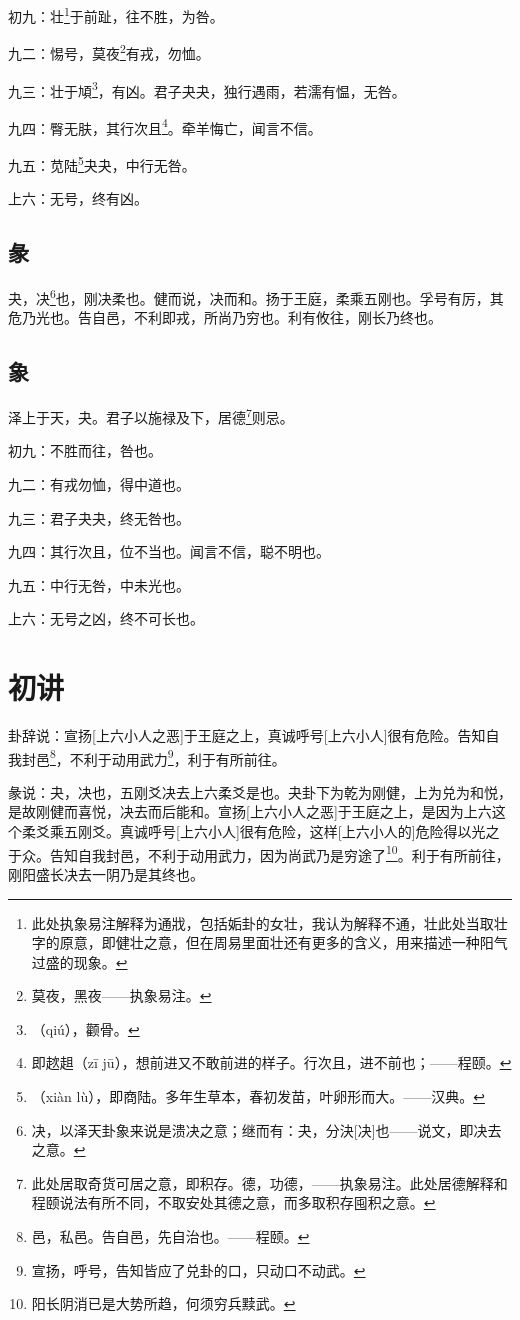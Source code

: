 \documentclass[12pt,oneside]{book}
\begin{document}
初九：壮\footnote{此处执象易注解释为通戕，包括姤卦的女壮，我认为解释不通，壮此处当取壮字的原意，即健壮之意，但在周易里面壮还有更多的含义，用来描述一种阳气过盛的现象。}于前趾，往不胜，为咎。

九二：惕号，莫夜\footnote{莫夜，黑夜——执象易注。}有戎，勿恤。

九三：壮于頄\footnote{（qiú），颧骨。}，有凶。君子夬夬，独行遇雨，若濡有愠，无咎。

九四：臀无肤，其行次且\footnote{即趑趄（zī jū），想前进又不敢前进的样子。行次且，进不前也；——程颐。}。牵羊悔亡，闻言不信。

九五：苋陆\footnote{（xiàn lù），即商陆。多年生草本，春初发苗，叶卵形而大。——汉典。}夬夬，中行无咎。

上六：无号，终有凶。

\subsection{彖}
夬，决\footnote{决，以泽天卦象来说是溃决之意；继而有：夬，分決[决]也——说文，即决去之意。}也，刚决柔也。健而说，决而和。扬于王庭，柔乘五刚也。孚号有厉，其危乃光也。告自邑，不利即戎，所尚乃穷也。利有攸往，刚长乃终也。

\subsection{象}
泽上于天，夬。君子以施禄及下，居德\footnote{此处居取奇货可居之意，即积存。德，功德，——执象易注。此处居德解释和程颐说法有所不同，不取安处其德之意，而多取积存囤积之意。}则忌。

初九：不胜而往，咎也。

九二：有戎勿恤，得中道也。

九三：君子夬夬，终无咎也。

九四：其行次且，位不当也。闻言不信，聪不明也。

九五：中行无咎，中未光也。

上六：无号之凶，终不可长也。

\section{初讲}
卦辞说：宣扬[上六小人之恶]于王庭之上，真诚呼号[上六小人]很有危险。告知自我封邑\footnote{邑，私邑。告自邑，先自治也。——程颐。}，不利于动用武力\footnote{宣扬，呼号，告知皆应了兑卦的口，只动口不动武。}，利于有所前往。

彖说：夬，决也，五刚爻决去上六柔爻是也。夬卦下为乾为刚健，上为兑为和悦，是故刚健而喜悦，决去而后能和。宣扬[上六小人之恶]于王庭之上，是因为上六这个柔爻乘五刚爻。真诚呼号[上六小人]很有危险，这样[上六小人的]危险得以光之于众。告知自我封邑，不利于动用武力，因为尚武乃是穷途了\footnote{阳长阴消已是大势所趋，何须穷兵黩武。}。利于有所前往，刚阳盛长决去一阴乃是其终也。
\end{document}
